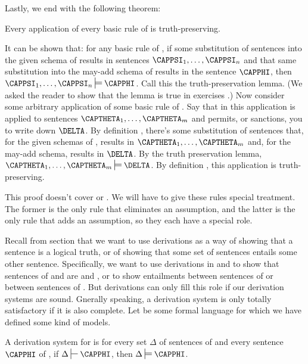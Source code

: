 Lastly, we end with the following theorem:
\begin{THEOREM}{}
	Every application of every basic rule of \GSD{} is truth-preserving.
\end{THEOREM}
\begin{PROOF}
	It can be shown that: for any basic rule  of \GSD{}, if some substitution of \GSL{} sentences into the given schema of  results in \GSL{} sentences $\CAPPSI_1,\ldots,\CAPPSI_{\integer{n}}$ and that same substitution into the may-add schema of  results in the \GSL{} sentence $\CAPPHI$, then $\CAPPSI_1,\ldots,\CAPPSI_{\integer{n}}\sdtstile{}{}\CAPPHI$.
	Call this the truth-preservation lemma.
	(We asked the reader to show that the lemma is true in exercises .)
	Now consider some arbitrary application of some basic rule  of \GSD{}. 
	Say that in this application  is applied to sentences $\CAPTHETA_1,\ldots,\CAPTHETA_{\integer{m}}$ and permits, or sanctions, you to write down $\DELTA$. 
	By definition , there's some substitution of \GSL{} sentences that, for the given schemas of , results in $\CAPTHETA_1,\ldots,\CAPTHETA_{\integer{m}}$ and, for the may-add schema, results in $\DELTA$. 
	By the truth preservation lemma, $\CAPTHETA_1,\ldots,\CAPTHETA_{\integer{m}}\sdtstile{}{}\DELTA$.
	By definition , this application is truth-preserving. 
	
	This proof doesn't cover  or .  We will have to give these rules special treatment.  The former is the only rule that eliminates an assumption, and the latter is the only rule that adds an assumption, so they each have a special role.
\end{PROOF}

Recall from section  that we want to use derivations as a way of showing that a sentence is a logical truth, or of showing that some set of sentences entails some other sentence.
Specifically, we want to use derivations in \GSD{} and \GQD{} to show that sentences of \GSL{} and \GQL{} are  and , or to show entailments between sentences of \GSL{} or between sentences of \GQL{}.  
But derivations can only fill this role if our derivation systems are sound.  Gnerally speaking, a derivation system is only totally satisfactory if it is also complete.
Let  be some formal language for which we have defined some kind of models.
\begin{majorILnc}{}
A derivation system  for  is  \Iff for every set $\Delta$ of sentences of  and every sentence $\CAPPHI$ of , if $\Delta\sststile{}{}\CAPPHI$, then $\Delta\sdtstile{}{}\CAPPHI$.
\end{majorILnc} 


